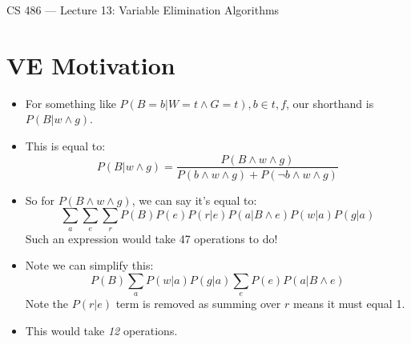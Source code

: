 \documentclass{article}
\author{Clement Tsang}
\begin{document}
\begin{center}
    \Large{CS 486 --- Lecture 13: Variable Elimination Algorithms}
\end{center}

\section{VE Motivation}
\begin{itemize}
    \item For something like $P(B = b | W = t \wedge G = t), b \in {t, f}$, our shorthand is $P(B | w \wedge g)$. 
    \item This is equal to:
        \[
            P(B | w \wedge g) = \frac{P(B \wedge w \wedge g)}{P(b \wedge w \wedge g) + P(\neg b \wedge w \wedge g)}
        \]
    \item So for $P(B \wedge w \wedge g)$, we can say it's equal to:
        \[
            \sum_a \sum_e \sum_r P(B)P(e)P(r|e)P(a|B \wedge e) P(w|a)P(g|a)
        \]
        Such an expression would take 47 operations to do!
    \item Note we can simplify this:
        \[
            P(B) \sum_a P(w|a)P(g|a) \sum_e P(e)P(a | B \wedge e)
        \]
        Note the $P(r|e)$ term is removed as summing over $r$ means it must equal 1.
    \item This would take \emph{12} operations.
\end{itemize}
\end{document}
